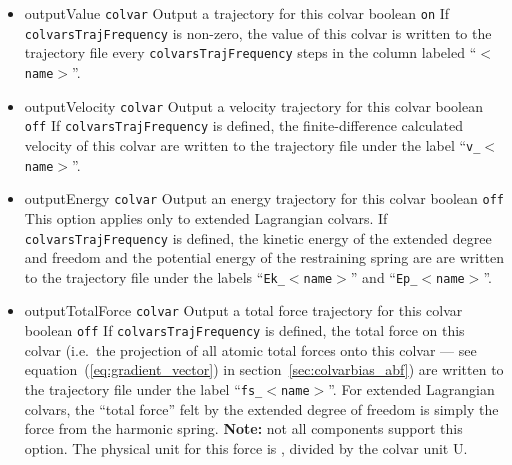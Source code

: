 \begin{itemize}
\item %
  \keydef
    {outputValue}{%
    \texttt{colvar}}{%
    Output a trajectory for this colvar}{%
    boolean}{%
    \texttt{on}}{%
    If \texttt{colvarsTrajFrequency} is non-zero, the value of this
    colvar is written to the trajectory file every
    \texttt{colvarsTrajFrequency} steps in the column labeled
    ``$<$\texttt{name}$>$''.}

\item %
  \keydef
    {outputVelocity}{%
    \texttt{colvar}}{%
    Output a velocity trajectory for this colvar}{%
    boolean}{%
    \texttt{off}}{%
    If \texttt{colvarsTrajFrequency} is defined, the
    finite-difference calculated velocity of this colvar are written
    to the trajectory file under the label
    ``\texttt{v\_}$<$\texttt{name}$>$''.}

\item %
  \keydef
    {outputEnergy}{%
    \texttt{colvar}}{%
    Output an energy trajectory for this colvar}{%
    boolean}{%
    \texttt{off}}{%
    This option applies only to extended Lagrangian colvars. If
    \texttt{colvarsTrajFrequency} is defined, the kinetic energy of
    the extended degree and freedom and the potential energy of the
    restraining spring are are written to the trajectory file under
    the labels ``\texttt{Ek\_}$<$\texttt{name}$>$'' and
    ``\texttt{Ep\_}$<$\texttt{name}$>$''.}

\item %
  \keydef
    {outputTotalForce}{%
    \texttt{colvar}}{%
    Output a total force trajectory for this
    colvar}{%
    boolean}{%
    \texttt{off}}{%
    If \texttt{colvarsTrajFrequency} is defined, the total force on this
    colvar (i.e.~the projection of all atomic total forces
    onto this colvar --- see
    equation~(\ref{eq:gradient_vector}) in
    section~\ref{sec:colvarbias_abf}) are written to the trajectory
    file under the label ``\texttt{fs\_}$<$\texttt{name}$>$''.
    For extended Lagrangian colvars, the ``total force'' felt by the extended degree of freedom
    is simply the force from the harmonic spring.
    \textbf{Note:} not all components support this option.  The
    physical unit for this force is , divided by the colvar unit U.}


\end{itemize}
